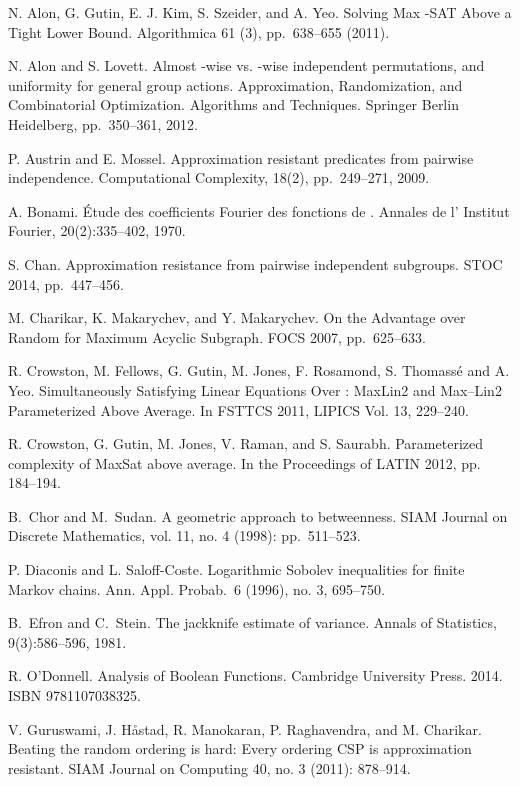 \documentclass[11pt]{article}
\begin{document}
\begin{thebibliography}{WW}
 N. Alon, G. Gutin, E. J. Kim, S. Szeider, and A. Yeo. Solving Max -SAT Above a Tight Lower Bound. Algorithmica 61 (3), pp.~638--655 (2011).	

N. Alon and S. Lovett. Almost -wise vs. -wise independent permutations, and uniformity for general group actions.
Approximation, Randomization, and Combinatorial Optimization. Algorithms and Techniques. Springer Berlin Heidelberg, pp.~350--361, 2012.

P. Austrin and E. Mossel. Approximation resistant predicates from pairwise independence. Computational Complexity, 18(2), pp.~249--271, 2009.


A. Bonami. \'{E}tude des coefficients Fourier des fonctions de . Annales de
l' Institut Fourier, 20(2):335--402, 1970.

S. Chan. Approximation resistance from pairwise independent subgroups.
STOC 2014, pp.~447--456.

M. Charikar, K. Makarychev, and Y. Makarychev.
On the Advantage over Random for Maximum Acyclic Subgraph.
FOCS 2007, pp.~625--633.



 R. Crowston, M. Fellows, G. Gutin, M. Jones, F. Rosamond, S. Thomass{\'e} and A. Yeo.
Simultaneously Satisfying Linear Equations Over : MaxLin2 and Max--Lin2
Parameterized Above Average. In FSTTCS 2011, LIPICS Vol. 13, 229--240.

R. Crowston, G. Gutin, M. Jones, V. Raman, and S. Saurabh. Parameterized complexity of MaxSat above average. In the Proceedings of LATIN 2012, pp. 184--194.

B.~Chor and M.~Sudan. A geometric approach to betweenness. SIAM Journal on Discrete Mathematics, vol. 11, no. 4 (1998): pp.~511--523.

P. Diaconis and L. Saloff-Coste. Logarithmic Sobolev inequalities for finite Markov chains. Ann. Appl. Probab.~6
(1996), no. 3, 695--750.

 B.~Efron and C.~Stein. The jackknife estimate of variance. Annals of
Statistics, 9(3):586--596, 1981.

 R. O'Donnell. Analysis of Boolean Functions. Cambridge University Press. 2014. ISBN 9781107038325.

V. Guruswami, J. H\aa{}stad, R. Manokaran, P. Raghavendra, and M. Charikar. Beating the random ordering is hard: Every ordering CSP is approximation resistant. SIAM Journal on Computing 40, no. 3 (2011): 878--914.



\end{thebibliography}
\end{document}
